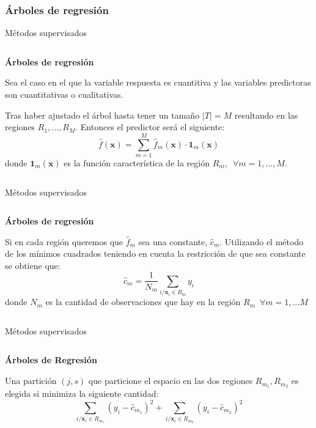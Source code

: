 \subsubsection{Árboles de regresión}
\begin{frame}{Métodos supervisados}
\begin{columns}
\begin{column}{0.9\textwidth}
\textbf{Árboles de regresión}

Sea el caso en el que la variable respuesta es cuantitiva y las variables predictoras son cuantitativas o cualitativas.

Tras haber ajustado el árbol hasta tener un tamaño $|T|=M$ resultando en las regiones $R_1,\ldots, R_M$. Entonces el predictor será el siguiente: 
\begin{equation}
\hat{f}(\mathbf{x})=\sum_{m=1}^M \hat{f}_m(\mathbf{x})\cdot \mathbf{1}_m(\mathbf{x})
\end{equation}
donde $\mathbf{1}_m(\mathbf{x})$ es la función característica de la región $R_m,\enspace \forall m=1,\ldots, M$.
\end{column}
\end{columns}
\end{frame}

\begin{frame}{Métodos supervisados}
\begin{columns}
\begin{column}{0.9\textwidth}
\textbf{Árboles de regresión}

Si en cada región queremos que $\hat{f}_m$ sea una constante, $\hat{c}_m$. Utilizando el método de los mínimos cuadrados teniendo en cuenta la restricción de que sea constante se obtiene que: 
\begin{equation}
\hat{c}_m=\dfrac{1}{N_m}\sum_{i/\mathbf{x}_i\in R_m} y_i
\end{equation}
donde $N_m$ es la cantidad de observaciones que hay en la región $R_m \enspace \forall m=1,\ldots M$
\end{column}
\end{columns}
\end{frame}

\begin{frame}{Métodos supervisados}
\begin{columns}
\begin{column}{0.9\textwidth}
\textbf{Árboles de Regresión}

Una partición $(j,s)$ que particione el espacio en las dos regiones $R_{m_1},R_{m_2}$ es elegida si minimiza la siguiente cantidad:
\begin{equation}
\sum_{i/\mathbf{x}_i\in R_{m_1} } (y_i-\hat{c}_{m_1})^2+\sum_{i/\mathbf{x}_i\in R_{m_2} } (y_i-\hat{c}_{m_2})^2
\end{equation}

\end{column}
\end{columns}
\end{frame}

